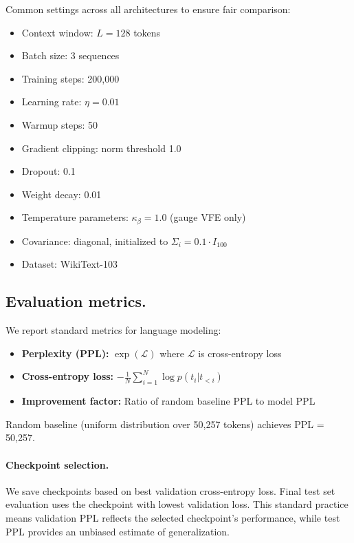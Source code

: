 \documentclass[twoside,11pt]{article}
\begin{document}
Common settings across all architectures to ensure fair comparison:

\begin{itemize}
  \item Context window: $L=128$ tokens
  \item Batch size: 3 sequences
  \item Training steps: 200,000
  \item Learning rate: $\eta = 0.01$
  \item Warmup steps: 50
  \item Gradient clipping: norm threshold 1.0
  \item Dropout: 0.1
  \item Weight decay: 0.01
  \item Temperature parameters: $\kappa_\beta = 1.0$ (gauge VFE only)
  \item Covariance: diagonal, initialized to $\Sigma_i = 0.1 \cdot I_{100}$
  \item Dataset: WikiText-103
\end{itemize}

\subsection{Evaluation metrics.}

We report standard metrics for language modeling:

\begin{itemize}
  \item \textbf{Perplexity (PPL):} $\exp(\mathcal{L})$ where $\mathcal{L}$ is cross-entropy loss
  \item \textbf{Cross-entropy loss:} $-\frac{1}{N}\sum_{i=1}^N \log p(t_i | t_{<i})$
  \item \textbf{Improvement factor:} Ratio of random baseline PPL to model PPL
\end{itemize}

Random baseline (uniform distribution over 50,257 tokens) achieves PPL = 50,257.

\paragraph{Checkpoint selection.} We save checkpoints based on best validation cross-entropy loss. Final test set evaluation uses the checkpoint with lowest validation loss. This standard practice means validation PPL reflects the selected checkpoint's performance, while test PPL provides an unbiased estimate of generalization.
\end{document}
